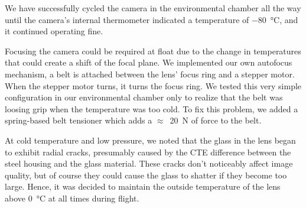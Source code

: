 We have successfully cycled the camera in the environmental chamber all the way until the camera's internal thermometer indicated a temperature of \SI{-80}{\celsius}, and it continued operating fine.

Focusing the camera could be required at float due to the change in temperatures that could create a shift of the focal plane. We implemented our own autofocus mechanism, a belt is attached between the lens' focus ring and a stepper motor. When the stepper motor turns, it turns the focus ring. We tested this very simple configuration in our environmental chamber only to realize that the belt was loosing grip when the temperature was too cold. To fix this problem, we added a spring-based belt tensioner which adds a $\approx$~\SI{20}{\newton} of force to the belt.

At cold temperature and low pressure, we noted that the glass in the lens began to exhibit radial cracks, presumably caused by the CTE difference between the steel housing and the glass material. These cracks don't noticeably affect image quality, but of course they could cause the glass to shatter if they become too large. Hence, it was decided to maintain the outside temperature of the lens above \SI{0}{\celsius} at all times during flight.

